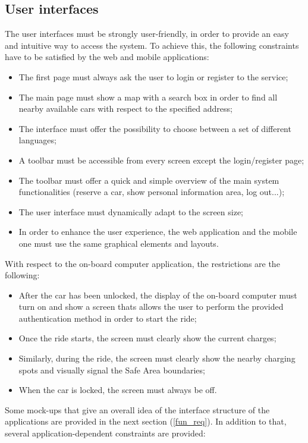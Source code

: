 \subsection{User interfaces}
The user interfaces must be strongly user-friendly, in order to provide an easy and intuitive way to access the system. To achieve this, the following constraints have to be satisfied by the web and mobile applications:
\begin{itemize}
\item The first page must always ask the user to login or register to the service;
\item The main page must show a map with a search box in order to find all nearby available cars with respect to the specified address;
\item The interface must offer the possibility to choose between a set of different languages;
\item A toolbar must be accessible from every screen except the login/register page;
\item The toolbar must offer a quick and simple overview of the main system functionalities (reserve a car, show personal information area, log out...);
\item The user interface must dynamically adapt to the screen size;
\item In order to enhance the user experience, the web application and the mobile one must use the same graphical elements and layouts.
\end{itemize}
With respect to the on-board computer application, the restrictions are the following:
\begin{itemize}
\item After the car has been unlocked, the display of the on-board computer must turn on and show a screen thats allows the user to perform the provided authentication method in order to start the ride;
\item Once the ride starts, the screen must clearly show the current charges;
\item Similarly, during the ride, the screen must clearly show the nearby charging spots and visually signal the Safe Area boundaries;
\item When the car is locked, the screen must always be off.
\end{itemize}
Some mock-ups that give an overall idea of the interface structure of the applications are provided in the next section (\ref{fun_req}).
In addition to that, several application-dependent constraints are provided:

